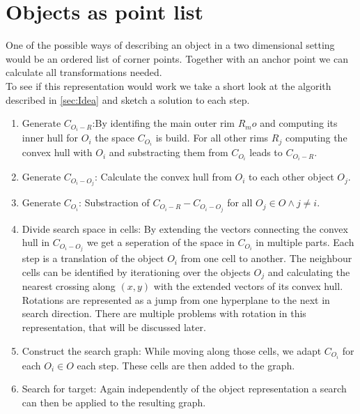 \section{Objects as point list}
One of the possible ways of describing an object in a two dimensional setting would be an ordered list of corner points.  Together with an anchor point we can calculate all transformations needed.\\
To see if this representation would work we take a short look at the algorith described in \ref{sec:Idea} and sketch a solution to each step.
\begin{enumerate}
\item Generate $C_{O_i-R}$:By identifing the main outer rim $R_mo$ and computing its inner hull for $O_i$ the space $C_{O_i}$ is build. For all other rims $R_j$ computing the convex hull with $O_i$ and substracting them from $C_{O_i}$ leads to $C_{O_i-R}$.
\item Generate $C_{O_i-O_j}$: Calculate the convex hull from $O_i$ to each other object $O_j$.
\item Generate $C_{O_i}$: Substraction of $C_{O_i-R} - C_{O_i-O_j}$ for all $O_j \in O \wedge j \neq i$.
\item Divide search space in cells: By extending the vectors connecting the convex hull in $C_{O_i-O_j}$ we get a seperation of the space in $C_{O_i}$ in multiple parts. Each step is a translation of the object $O_i$  from one cell to another. The neighbour cells can be identified by iterationing over the objects $O_j$ and calculating the nearest crossing along $(x,y)$ with the extended vectors of its convex hull. \\ Rotations are represented as a jump from one hyperplane to the next in search direction. There are multiple problems with rotation in this representation, that will be discussed later.
\item Construct the search graph: While moving along those cells, we adapt $C_{O_i}$ for each $O_i \in O$ each step. These cells are then added to the graph.
\item Search for target: Again independently of the object representation a search can then be applied to the resulting graph. 
\end{enumerate}


